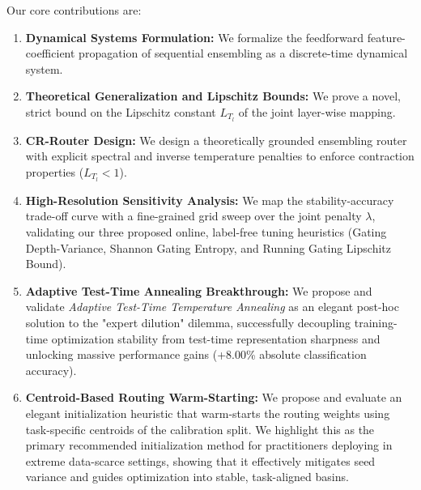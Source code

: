 Our core contributions are:
\begin{enumerate}
  \item \textbf{Dynamical Systems Formulation:} We formalize the feedforward feature-coefficient propagation of sequential ensembling as a discrete-time dynamical system.
  \item \textbf{Theoretical Generalization and Lipschitz Bounds:} We prove a novel, strict bound on the Lipschitz constant $L_{T_l}$ of the joint layer-wise mapping.
  \item \textbf{CR-Router Design:} We design a theoretically grounded ensembling router with explicit spectral and inverse temperature penalties to enforce contraction properties ($L_{T_l} < 1$).
  \item \textbf{High-Resolution Sensitivity Analysis:} We map the stability-accuracy trade-off curve with a fine-grained grid sweep over the joint penalty $\lambda$, validating our three proposed online, label-free tuning heuristics (Gating Depth-Variance, Shannon Gating Entropy, and Running Gating Lipschitz Bound).
  \item \textbf{Adaptive Test-Time Annealing Breakthrough:} We propose and validate \emph{Adaptive Test-Time Temperature Annealing} as an elegant post-hoc solution to the "expert dilution" dilemma, successfully decoupling training-time optimization stability from test-time representation sharpness and unlocking massive performance gains (+8.00\% absolute classification accuracy).
  \item \textbf{Centroid-Based Routing Warm-Starting:} We propose and evaluate an elegant initialization heuristic that warm-starts the routing weights using task-specific centroids of the calibration split. We highlight this as the primary recommended initialization method for practitioners deploying in extreme data-scarce settings, showing that it effectively mitigates seed variance and guides optimization into stable, task-aligned basins.
\end{enumerate}
